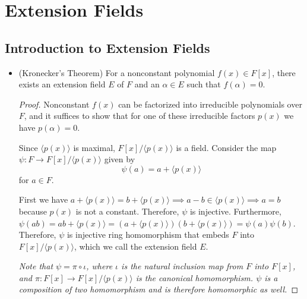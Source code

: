 \documentclass[11pt]{article}
\newcommand{\gen}[1]{\langle #1 \rangle}
\begin{document}
\section{Extension Fields}
\setcounter{subsection}{28}
\subsection{Introduction to Extension Fields}
\begin{itemize}
    \item (Kronecker's Theorem) For a nonconstant polynomial $f(x) \in F[x]$, there exists an extension field $E$ of $F$ and an $\alpha \in E$ such that $f(\alpha) = 0$.
    \begin{proof}
        Nonconstant $f(x)$ can be factorized into irreducible polynomials over $F$, and it suffices to show that for one of these irreducible factors $p(x)$ we have $p(\alpha) = 0$.

        Since $\gen{p(x)}$ is maximal, $F[x]/\gen{p(x)}$ is a field. Consider the map $\psi: F \to F[x]/\gen{p(x)}$ given by \[\psi(a) = a + \gen{p(x)}\] for $a \in F$.

        First we have $a + \gen{p(x)} = b + \gen{p(x)} \implies a - b \in \gen{p(x)} \implies a = b$ because $p(x)$ is not a constant. Therefore, $\psi$ is injective. Furthermore, $\psi(ab) = ab+\gen{p(x)} = (a+\gen{p(x)})(b+\gen{p(x)}) = \psi(a)\psi(b)$. Therefore, $\psi$ is injective ring homomorphism that embeds $F$ into $F[x]/\gen{p(x)}$, which we call the extension field $E$.
        
        \emph{Note that $\psi = \pi \circ \iota$, where $\iota$ is the natural inclusion map from $F$ into $F[x]$, and $\pi: F[x] \to F[x]/\gen{p(x)}$ is the canonical homomorphism. $\psi$ is a composition of two homomorphism and is therefore homomorphic as well.}


\end{proof}
\end{itemize}
\end{document}
